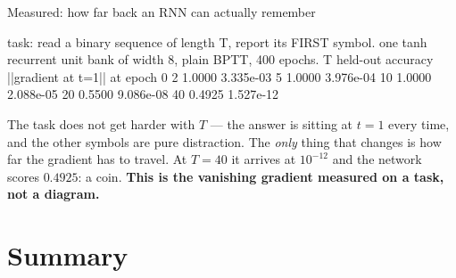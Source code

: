 \documentclass[aspectratio=169]{beamer}
\begin{document}
\begin{frame}[fragile,shrink=6]{Measured: how far back an RNN can actually remember}
\begin{outblk}
task: read a binary sequence of length T, report its FIRST symbol.
one tanh recurrent unit bank of width 8, plain BPTT, 400 epochs.
      T   held-out accuracy   ||gradient at t=1|| at epoch 0
      2       1.0000              3.335e-03
      5       1.0000              3.976e-04
     10       1.0000              2.088e-05
     20       0.5500              9.086e-08
     40       0.4925              1.527e-12
\end{outblk}
  \begin{center}\small
    The task does not get harder with $T$ --- the answer is sitting at
    $t = 1$ every time, and the other symbols are pure distraction. The
    \emph{only} thing that changes is how far the gradient has to travel. At
    $T = 40$ it arrives at $10^{-12}$ and the network scores $0.4925$: a coin.
    \textbf{This is the vanishing gradient measured on a task, not a
    diagram.}
  \end{center}
\end{frame}

\section{Summary}
\label{sec:summary}
\end{document}
